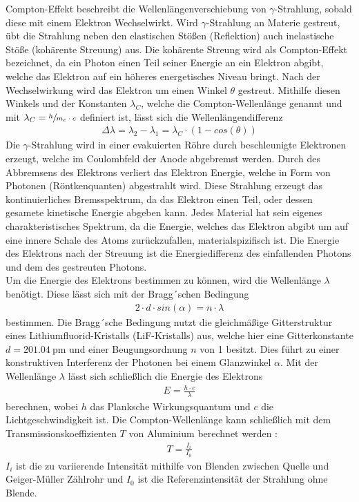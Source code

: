     \justifying Compton-Effekt beschreibt die Wellenlängenverschiebung von $\gamma$-Strahlung, sobald diese mit einem Elektron Wechselwirkt. 
    Wird $\gamma$-Strahlung an Materie gestreut, übt die Strahlung neben den elastischen Stößen (Reflektion) auch inelastische Stöße (kohärente Streuung) aus. 
    Die kohärente Streung wird als Compton-Effekt bezeichnet, da ein Photon einen Teil seiner Energie an ein Elektron abgibt, welche das Elektron auf ein 
    höheres energetisches Niveau bringt. Nach der Wechselwirkung wird das Elektron um einen Winkel $\theta$ gestreut. Mithilfe diesen Winkels und der Konstanten
    $\lambda_C$, welche die Compton-Wellenlänge genannt und mit $\lambda_C = \sfrac{h}{m_e \cdot c}$ definiert ist, lässt sich die Wellenlängendifferenz \cite{V603}
    \begin{align}
        \Delta \lambda = \lambda_2 - \lambda_1 = \lambda_C \cdot (1-cos(\theta)) \label{eq:1}
    \end{align}
    \justifying Die $\gamma$-Strahlung wird in einer evakuierten Röhre durch beschleunigte Elektronen erzeugt, welche im Coulombfeld der Anode
    abgebremst werden. Durch des Abbremsens des Elektrons verliert das Elektron Energie, welche in Form von Photonen (Röntkenquanten) abgestrahlt wird. Diese Strahlung
    erzeugt das kontinuierliches Bremsspektrum, da das Elektron einen Teil, oder dessen gesamete kinetische Energie abgeben kann. Jedes Material hat sein eigenes charakteristisches 
    Spektrum, da die Energie, welches das Elektron abgibt um auf eine innere Schale des 
    Atoms zurückzufallen, materialspizifisch ist. Die Energie des Elektrons nach der Streuung ist die Energiedifferenz des einfallenden Photons und dem des gestreuten 
    Photons.\\
    Um die Energie des Elektrons bestimmen zu können, wird die Wellenlänge $\lambda$ benötigt. Diese lässt sich mit der Bragg´schen Bedingung \cite{V603}
    \begin{align}
        2 \cdot d \cdot sin(\alpha) = n \cdot \lambda \label{eq:2}
    \end{align}
    bestimmen. Die Bragg´sche Bedingung nutzt die gleichmäßige Gitterstruktur eines Lithiumfluorid-Kristalls (LiF-Kristalls) aus, welche hier eine Gitterkonstante $d = \SI{201.04}
    {\pico\meter}$ und einer Beugungsordnung $n$ von 1 besitzt. Dies führt zu einer konstruktiven Interferenz der Photonen bei einem Glanzwinkel $\alpha$. Mit der Wellenlänge
    $\lambda$ lässt sich schließlich die Energie des Elektrons
    \begin{align}
        E = \frac{h \cdot c}{\lambda} \label{eq:3}
    \end{align}
    berechnen, wobei $h$ das Planksche Wirkungsquantum und $c$ die Lichtgeschwindigkeit ist. Die Compton-Wellenlänge kann schließlich mit dem Transmissionskoeffizienten $T$ von
    Aluminium berechnet werden \cite{V603}:
    \begin{align}
        T = \frac{I_i}{I_0} \label{eq:T}
    \end{align}
    $I_i$ ist die zu variierende Intensität mithilfe von Blenden zwischen Quelle und Geiger-Müller Zählrohr und $I_0$ ist die Referenzintensität der Strahlung ohne Blende. 


